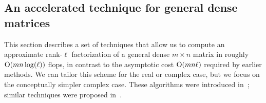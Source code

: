 \documentclass[final]{siamltex}
\newcounter{algorithm}[section]
\newcommand{\pgnotate}[1]{{\color{blue}[#1]}}
\begin{document}
\begin{figure}
\begin{center}
\end{center}
\end{figure}


\subsection{An accelerated technique for general dense matrices}
\label{sec:ailonchazelle}

This section describes a set of techniques that allow us to compute
an approximate rank-$\ell$ factorization of a general dense $m \times n$
matrix in roughly $\mathrm{O}(mn\log(\ell))$ flops, in contrast to the
asymptotic cost $\mathrm{O}(mn\ell)$ required by earlier methods.
We can tailor this scheme for the real or complex case, but we focus on
the conceptually simpler complex case.
These algorithms were introduced in~\cite{random2};
similar techniques were proposed in~\cite{Sar06:Improved-Approximation}.
\end{document}
